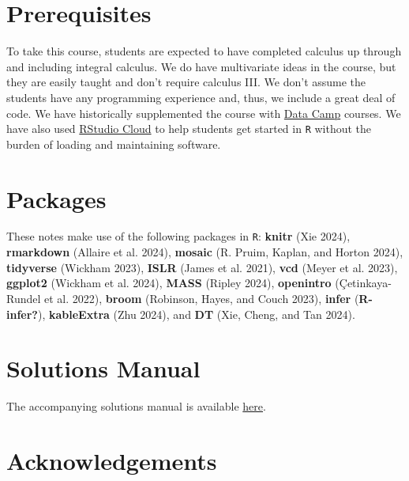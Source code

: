 \documentclass[
  letterpaper,
  DIV=11,
  numbers=noendperiod]{scrreprt}
\begin{document}
\section*{Prerequisites}\label{prerequisites}


To take this course, students are expected to have completed calculus up
through and including integral calculus. We do have multivariate ideas
in the course, but they are easily taught and don't require calculus
III. We don't assume the students have any programming experience and,
thus, we include a great deal of code. We have historically supplemented
the course with \href{http://datacamp.com/}{Data Camp} courses. We have
also used \href{http://rstudio.cloud}{RStudio Cloud} to help students
get started in \texttt{R} without the burden of loading and maintaining
software.

\section*{Packages}\label{packages}


These notes make use of the following packages in \texttt{R}:
\textbf{knitr} (Xie 2024), \textbf{rmarkdown} (Allaire et al. 2024),
\textbf{mosaic} (R. Pruim, Kaplan, and Horton 2024), \textbf{tidyverse}
(Wickham 2023), \textbf{ISLR} (James et al. 2021), \textbf{vcd} (Meyer
et al. 2023), \textbf{ggplot2} (Wickham et al. 2024), \textbf{MASS}
(Ripley 2024), \textbf{openintro} (Çetinkaya-Rundel et al. 2022),
\textbf{broom} (Robinson, Hayes, and Couch 2023), \textbf{infer}
(\textbf{R-infer?}), \textbf{kableExtra} (Zhu 2024), and \textbf{DT}
(Xie, Cheng, and Tan 2024).

\section*{Solutions Manual}\label{solutions-manual}


The accompanying solutions manual is available
\href{https://ds-usafa.github.io/CPS-Solutions-Manual/}{here}.

\section*{Acknowledgements}\label{acknowledgements}
\end{document}
